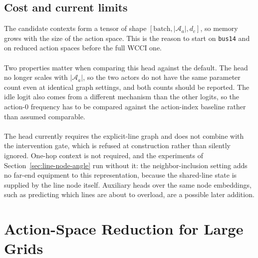 {\color{blue}
\subsection{Cost and current limits}
\label{subsec:candidate-configuration}

The candidate contexts form a tensor of shape
$\left[\text{batch},|\mathcal{A}_a|,d_c\right]$, so memory grows with the size
of the action space. This is the reason to start on \texttt{bus14} and on
reduced action spaces before the full WCCI one.
\\
\\
Two properties matter when comparing this head against the default. The head no
longer scales with $|\mathcal{A}_a|$, so the two actors do not have the same
parameter count even at identical graph settings, and both counts should be
reported. The idle logit also comes from a different mechanism than the other
logits, so the action-$0$ frequency has to be compared against the action-index
baseline rather than assumed comparable.
\\
\\
The head currently requires the explicit-line graph and does not combine with
the intervention gate, which is refused at construction rather than silently
ignored. One-hop context is not required, and the experiments of
Section~\ref{sec:line-node-angle} run without it: the neighbor-inclusion setting
adds no far-end equipment to this representation, because the shared-line state
is supplied by the line node itself. Auxiliary heads over the same node
embeddings, such as predicting which lines are about to overload, are a possible
later addition.
}
\section{Action-Space Reduction for Large Grids}
\label{sec:wcci-action-space-reduction}

